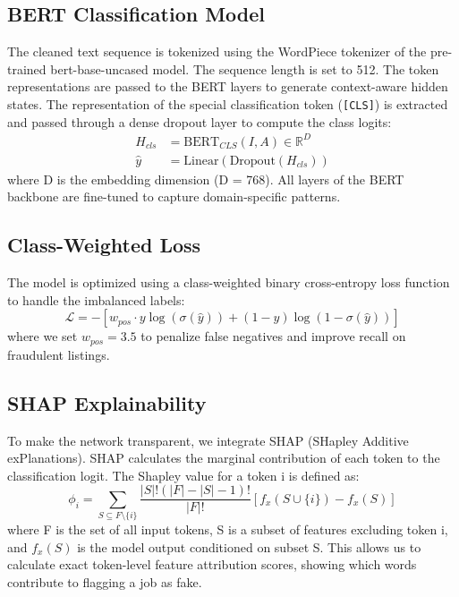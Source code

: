 \documentclass[conference]{IEEEtran}
\begin{document}
\subsection{BERT Classification Model}
The cleaned text sequence is tokenized using the WordPiece tokenizer of the pre-trained bert-base-uncased model. The sequence length is set to 512. The token representations are passed to the BERT layers to generate context-aware hidden states. The representation of the special classification token (\texttt{[CLS]}) is extracted and passed through a dense dropout layer to compute the class logits:
\begin{align}
H_{cls} &= \text{BERT}_{CLS}(I, A) \in \mathbb{R}^{D} \\
\hat{y} &= \text{Linear}(\text{Dropout}(H_{cls}))
\end{align}
where D is the embedding dimension (D = 768). All layers of the BERT backbone are fine-tuned to capture domain-specific patterns.

\subsection{Class-Weighted Loss}
The model is optimized using a class-weighted binary cross-entropy loss function to handle the imbalanced labels:
\begin{equation}
\mathcal{L} = - [ w_{pos} \cdot y \log(\sigma(\hat{y})) + (1 - y) \log(1 - \sigma(\hat{y})) ]
\end{equation}
where we set $w_{pos} = 3.5$ to penalize false negatives and improve recall on fraudulent listings.

\subsection{SHAP Explainability}
To make the network transparent, we integrate SHAP (SHapley Additive exPlanations). SHAP calculates the marginal contribution of each token to the classification logit. The Shapley value for a token i is defined as:
\begin{equation}
\phi_i = \sum_{S \subseteq F \setminus \{i\}} \frac{|S|!(|F| - |S| - 1)!}{|F|!} [ f_x(S \cup \{i\}) - f_x(S) ]
\end{equation}
where F is the set of all input tokens, S is a subset of features excluding token i, and $f_x(S)$ is the model output conditioned on subset S. This allows us to calculate exact token-level feature attribution scores, showing which words contribute to flagging a job as fake.
\end{document}
